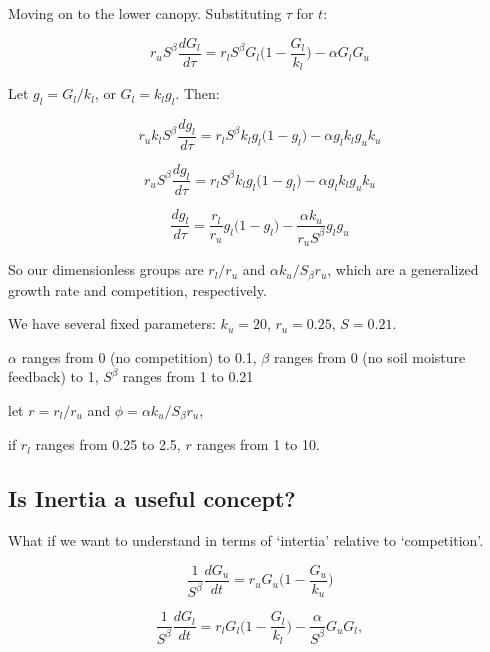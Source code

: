 \documentclass[12pt]{article}
\begin{document}
Moving on to the lower canopy.  Substituting $\tau$ for $t$:

\begin{equation*}
	 r_u S^\beta \frac{d G_l}{d \tau } = r_l S^\beta G_l \bigg(1-\frac{G_l}{k_l}\bigg) - \alpha G_l G_u
\end{equation*}

Let  $g_l = G_l/k_l$, or   $G_l =   k_l g_l$.  Then:

\begin{equation*}
r_u   k_l  S^\beta \frac{d g_l}{d \tau } = r_l S^\beta k_l g_l \big(1-g_l \big) - \alpha g_l k_l g_u k_u
\end{equation*}

\begin{equation*}
r_u   S^\beta \frac{d g_l}{d \tau } = r_l S^\beta k_l g_l \big(1-g_l \big) - \alpha g_l k_l g_u k_u
\end{equation*}

\begin{equation*}
 \frac{d g_l}{d \tau } =\frac{ r_l}{r_u }  g_l \big(1-g_l \big) - \frac{\alpha k_u}{r_u  S^\beta}  g_l g_u
\end{equation*}

So our dimensionless groups are $r_l/r_u$ and $\alpha k_u / S_\beta r_u$, which are a generalized growth rate and competition, respectively.


We have several fixed parameters:  $k_u = 20$, $r_u = 0.25$, $S=0.21$.

$\alpha$ ranges from 0 (no competition) to 0.1,
$\beta$ ranges from 0 (no soil moisture feedback) to 1, $S^\beta$ ranges from 1  to 0.21

let  $r = r_l/r_u$ and $\phi =  \alpha k_u / S_\beta r_u$,

if $r_l$ ranges from 0.25 to 2.5,  $r$ ranges from 1 to 10.

\subsection*{Is Inertia a useful concept?}

What if we want to understand in terms of `intertia' relative to `competition'.


\begin{equation}
    \frac{1}{S^\beta}    \frac{dG_u}{dt} =  r_{u}  G_u \big(1-\frac{G_u}{k_u}\big)
\end{equation}

 \begin{equation}
    \frac{1}{S^\beta}    \frac{d G_l}{dt} = r_l  G_l \big(1-\frac{G_l}{k_l}\big) - \frac{\alpha}{S^\beta} G_u G_l,
\end{equation}
\end{document}
